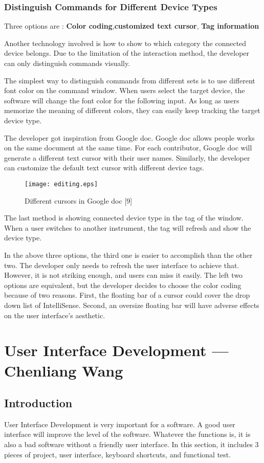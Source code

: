 \documentclass [10pt]{article}
\begin{document}
\subsubsection{Distinguish Commands for Different Device Types}
Three options are : \textbf{Color coding},\textbf{customized text cursor}, \textbf{Tag information} \par
 Another technology involved is how to show to which category the connected device belongs. Due to the limitation of the interaction method, the developer can only distinguish commands visually.\par
 The simplest way to distinguish commands from different sets is to use different font color on the command window. When users select the target device, the software will change the font color for the following input. As long as users memorize the meaning of different colors, they can easily keep tracking the target device type.\par
 The developer got inspiration from Google doc. Google doc allows people works on the same document at the same time. For each contributor, Google doc will generate a different text cursor with their user names. Similarly, the developer can customize the default text cursor with different device tags.\par
\begin{figure}[t]
\centering
\texttt{[image: editing.eps]}
\caption{Different cursors in Google doc [9]}
\end{figure} 
The last method is showing connected device type in the tag of the window. When a user switches to another instrument, the tag will refresh and show the device type.\par
In the above three options, the third one is easier to accomplish than the other two. The developer only needs to refresh the user interface to achieve that. However, it is not striking enough, and users can miss it easily. The left two options are equivalent, but the developer decides to choose the color coding because of two reasons. First, the floating bar of a cursor could cover the drop down list of IntelliSense. Second, an oversize floating bar will have adverse effects on the user interface's aesthetic.     
 
\newpage
\section{User Interface Development --- Chenliang Wang}

\subsection{Introduction}
User Interface Development is very important for a software. A good user interface will improve the level of the software. Whatever the functions is, it is also a bad software without a friendly user interface. In this section, it includes 3 pieces of project, user interface, keyboard shortcuts, and functional test. 
\end{document}
